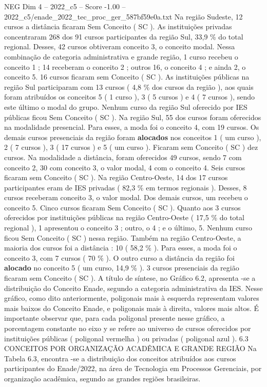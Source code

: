 \begin{textsample}{NEG Dim 4 – 2022\_c5 – Score -1.00 – 2022\_c5/enade\_2022\_tec\_proc\_ger\_587bf59e0a.txt}
Na região Sudeste, 12 cursos a distância ficaram Sem Conceito ( SC ).
As instituições privadas concentraram 268 dos 91 cursos participantes da região Sul, 33,9 \% do total regional.
Desses, 42 cursos obtiveram conceito 3, o conceito modal.
Nessa combinação de categoria administrativa e grande região, 1 curso recebeu o conceito 1 ; 14 receberam o conceito 2 ; outros 16, o conceito 4 ; e ainda 2, o conceito 5. 16 cursos ficaram sem Conceito ( SC ).
As instituições públicas na região Sul participaram com 13 cursos ( 4,8 \% dos cursos da região ), aos quais foram atribuídos os conceitos 5 ( 1 curso ), 3 ( 5 cursos ) e 4 ( 7 cursos ), sendo este último o modal do grupo.
Nenhum curso da região Sul oferecido por IES públicas ficou Sem Conceito ( SC ).
Na região Sul, 55 dos cursos foram oferecidos na modalidade presencial.
Para esses, a moda foi o conceito 4, com 19 cursos.
Os demais cursos presenciais da região foram \textbf{alocados} nos conceitos 1 ( um curso ), 2 ( 7 cursos ), 3 ( 17 cursos ) e 5 ( um curso ).
Ficaram sem Conceito ( SC ) dez cursos.
Na modalidade a distância, foram oferecidos 49 cursos, sendo 7 com conceito 2, 30 com conceito 3, o valor modal, 4 com o conceito 4.
Seis cursos ficaram sem Conceito ( SC ).
Na região Centro-Oeste, 14 dos 17 cursos participantes eram de IES privadas ( 82,3 \% em termos regionais ).
Desses, 8 cursos receberam conceito 3, o valor modal.
Dos demais cursos, um recebeu o conceito 5.
Cinco cursos ficaram Sem Conceito ( SC ).
Quanto aos 3 cursos oferecidos por instituições públicas na região Centro-Oeste ( 17,5 \% do total regional ), 1 apresentou o conceito 3 ; outro, o 4 ; e o último, 5.
Nenhum curso ficou Sem Conceito ( SC ) nessa região.
Também na região Centro-Oeste, a maioria dos cursos foi a distância : 10 ( 58,2 \% ).
Para esses, a moda foi o conceito 3, com 7 cursos ( 70 \% ).
O outro curso a distância da região foi \textbf{alocado} no conceito 5 ( um curso, 14,9 \% ). 3 cursos presenciais da região ficaram sem Conceito ( SC ).
A título de síntese, no Gráfico 6.2, apresenta -se a distribuição do Conceito Enade, segundo a categoria administrativa da IES.
Nesse gráfico, como dito anteriormente, poligonais mais à esquerda representam valores mais baixos do Conceito Enade, e poligonais mais à direita, valores mais altos.
É importante observar que, para cada poligonal presente nesse gráfico, a porcentagem constante no eixo y se refere ao universo de cursos oferecidos por instituições públicas ( poligonal vermelha ) ou privadas ( poligonal azul ). 6.3 CONCEITOS POR ORGANIZAÇÃO ACADÊMICA E GRANDE REGIÃO Na Tabela 6.3, encontra -se a distribuição dos conceitos atribuídos aos cursos participantes do Enade/2022, na área de Tecnologia em Processos Gerenciais, por organização acadêmica, segundo as grandes regiões brasileiras.

\end{textsample}
